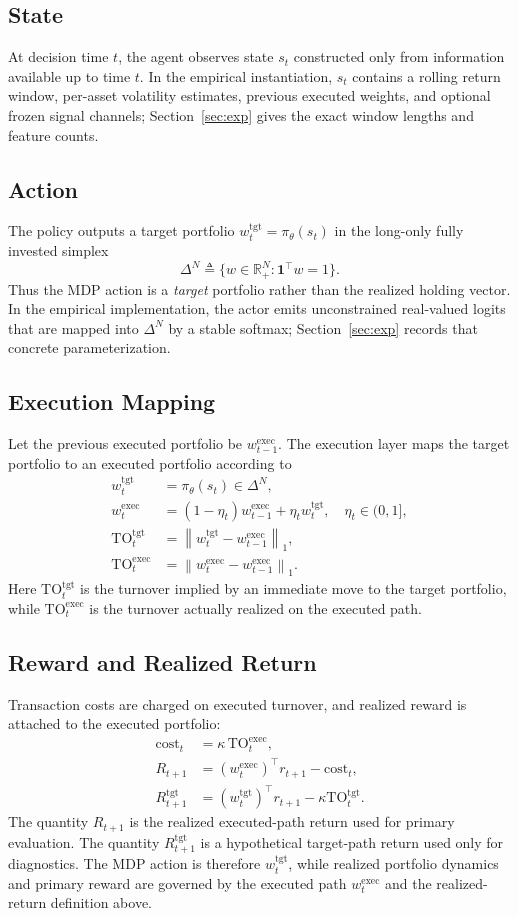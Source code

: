 \documentclass[10pt,twocolumn]{article}
\newcommand{\wexec}{w^{\mathrm{exec}}}
\newcommand{\wtgt}{w^{\mathrm{tgt}}}
\newcommand{\TOexec}{\mathrm{TO}^{\mathrm{exec}}}
\newcommand{\TOtgt}{\mathrm{TO}^{\mathrm{tgt}}}
\newcommand{\kappaTC}{\kappa}
\newcommand{\R}{\mathbb{R}}
\newcommand{\normone}[1]{\left\lVert #1 \right\rVert_1}
\newcommand{\DeltaN}{\Delta^N}
\begin{document}
\subsection{State}
At decision time $t$, the agent observes state $s_t$ constructed only from information available up to time $t$. In the empirical instantiation, $s_t$ contains a rolling return window, per-asset volatility estimates, previous executed weights, and optional frozen signal channels; Section~\ref{sec:exp} gives the exact window lengths and feature counts.

\subsection{Action}
The policy outputs a target portfolio $\wtgt_t=\pi_\theta(s_t)$ in the long-only fully invested simplex
\[
\DeltaN \triangleq \{w\in\R^N_+:\mathbf{1}^\top w=1\}.
\]
Thus the MDP action is a \emph{target} portfolio rather than the realized holding vector. In the empirical implementation, the actor emits unconstrained real-valued logits that are mapped into $\DeltaN$ by a stable softmax; Section~\ref{sec:exp} records that concrete parameterization.



\subsection{Execution Mapping}
Let the previous executed portfolio be $\wexec_{t-1}$. The execution layer maps the target portfolio to an executed portfolio according to
\begin{align*}
\wtgt_t &= \pi_\theta(s_t)\in\DeltaN, \\
\wexec_t &= (1-\eta_t)\wexec_{t-1} + \eta_t \wtgt_t,\quad \eta_t\in(0,1], \\
\TOtgt_t &= \normone{\wtgt_t - \wexec_{t-1}}, \\
\TOexec_t &= \normone{\wexec_t - \wexec_{t-1}}.
\end{align*}
Here $\TOtgt_t$ is the turnover implied by an immediate move to the target portfolio, while $\TOexec_t$ is the turnover actually realized on the executed path.

\subsection{Reward and Realized Return}
Transaction costs are charged on executed turnover, and realized reward is attached to the executed portfolio:
\begin{align*}
\mathrm{cost}_{t} &= \kappaTC \, \TOexec_t, \\
R_{t+1} &= (\wexec_t)^\top r_{t+1} - \mathrm{cost}_t, \\
R^{\mathrm{tgt}}_{t+1} &= (\wtgt_t)^\top r_{t+1} - \kappaTC \TOtgt_t.
\end{align*}
The quantity $R_{t+1}$ is the realized executed-path return used for primary evaluation. The quantity $R^{\mathrm{tgt}}_{t+1}$ is a hypothetical target-path return used only for diagnostics. The MDP action is therefore $\wtgt_t$, while realized portfolio dynamics and primary reward are governed by the executed path $\wexec_t$ and the realized-return definition above.
\end{document}
